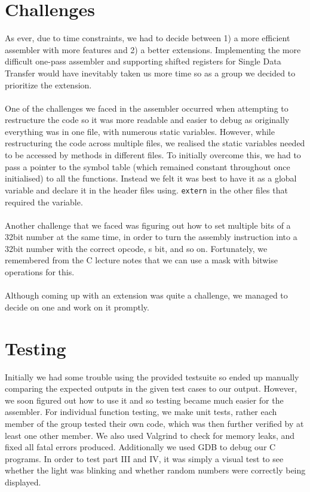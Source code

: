 \documentclass[11pt,twoside]{article}
\begin{document}
\section{Challenges}
 As ever, due to time constraints, we had to decide between 1) a more efficient assembler with more features and 2) a better extensions. Implementing the more difficult one-pass assembler and supporting shifted registers for Single Data Transfer would have inevitably taken us more time so as a group we decided to prioritize the extension. \\\\
 One of the challenges we faced in the assembler occurred when attempting to restructure the code so it was more readable and easier to debug as originally everything was in one file, with numerous static variables. However, while restructuring the code across multiple files, we realised the static variables needed to be accessed by methods in different files. To initially overcome this, we had to pass a pointer to the symbol table (which remained constant throughout once initialised) to all the functions. Instead we felt it was best to have it as a global variable and declare it in the header files using. \texttt{extern} in the other files that required the variable. \\\\
 Another challenge that we faced was figuring out how to set multiple bits of a 32bit number at the same time, in order to turn the assembly instruction into a 32bit number with the correct opcode, s bit, and so on. Fortunately, we remembered from the C lecture notes that we can use a mask with bitwise operations for this.\\\\
 Although coming up with an extension was quite a challenge, we managed to decide on one and work on it promptly.
\section{Testing}
Initially we had some trouble using the provided testsuite so ended up manually comparing the expected outputs in the given test cases to our output. However, we soon figured out how to use it and so testing became much easier for the assembler. For individual function testing, we make unit tests, rather each member of the group tested their own code, which was then further verified by at least one other member. We also used Valgrind to check for memory leaks, and fixed all fatal errors produced. Additionally we used GDB to debug our C programs. In order to test part III and IV, it was simply a visual test to see whether the light was blinking and whether random numbers were correctly being displayed.
\end{document}
